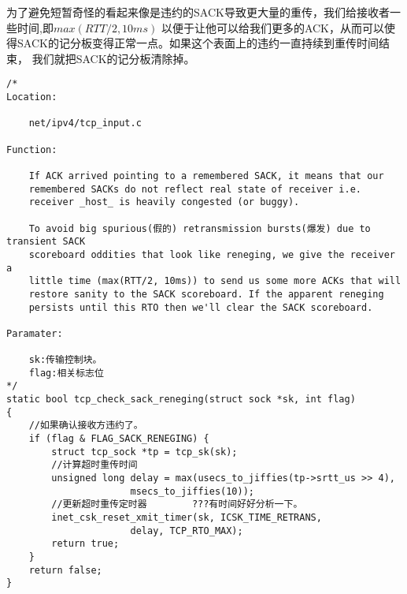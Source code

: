             为了避免短暂奇怪的看起来像是违约的SACK导致更大量的重传，我们给接收者一些时间,即$max(RTT/2, 10ms)$
            以便于让他可以给我们更多的ACK，从而可以使得SACK的记分板变得正常一点。如果这个表面上的违约一直持续到重传时间结束，
            我们就把SACK的记分板清除掉。
\begin{verbatim}
/*
Location:

    net/ipv4/tcp_input.c

Function:

    If ACK arrived pointing to a remembered SACK, it means that our
    remembered SACKs do not reflect real state of receiver i.e.
    receiver _host_ is heavily congested (or buggy).

    To avoid big spurious(假的) retransmission bursts(爆发) due to transient SACK
    scoreboard oddities that look like reneging, we give the receiver a
    little time (max(RTT/2, 10ms)) to send us some more ACKs that will
    restore sanity to the SACK scoreboard. If the apparent reneging
    persists until this RTO then we'll clear the SACK scoreboard.

Paramater:

    sk:传输控制块。
    flag:相关标志位
*/
static bool tcp_check_sack_reneging(struct sock *sk, int flag)
{
    //如果确认接收方违约了。
    if (flag & FLAG_SACK_RENEGING) {
        struct tcp_sock *tp = tcp_sk(sk);
        //计算超时重传时间
        unsigned long delay = max(usecs_to_jiffies(tp->srtt_us >> 4),
                      msecs_to_jiffies(10));
        //更新超时重传定时器        ???有时间好好分析一下。
        inet_csk_reset_xmit_timer(sk, ICSK_TIME_RETRANS,
                      delay, TCP_RTO_MAX);
        return true;
    }
    return false;
}
\end{verbatim}
